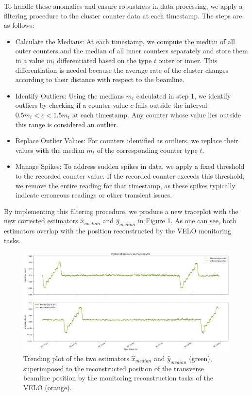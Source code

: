 To handle these anomalies and ensure robustness in data processing, we apply a filtering procedure to the cluster counter data at each timestamp. The steps are as follows:
\begin{itemize}
    \item Calculate the Medians: At each timestamp, we compute the median of all outer counters and the median of all inner counters separately and store them in a value $m_t$ differentiated based on the type $t$ outer or inner. This differentiation is needed because the average rate of the cluster changes according to their distance with respect to the beamline.
    \item Identify Outliers: Using the medians $m_t$ calculated in step 1, we identify outliers by checking if a counter value $c$ falls outside the interval $0.5 m_t < c < 1.5 m_t$ at each timestamp. Any counter whose value lies outside this range is considered an outlier.
    \item Replace Outlier Values: For counters identified as outliers, we replace their values with the median $m_t$ of the corresponding counter type $t$.
    \item Manage Spikes: To address sudden spikes in data, we apply a fixed threshold to the recorded counter value. If the recorded counter exceeds this threshold, we remove the entire reading for that timestamp, as these spikes typically indicate erroneous readings or other transient issues.
\end{itemize}

By implementing this filtering procedure, we produce a new traceplot with the new corrected estimators $\hat{x}_{median}$ and $\hat{y}_{median}$ in Figure \ref{fig:traceplot_off}. As one can see, both estimators overlap with the position reconstructed by the VELO monitoring tasks. 

\begin{figure}
    \centering
    \includegraphics[width=\textwidth]{figures/traceplot_zoom.png}
    \caption{Trending plot of the two estimators $\hat{x}_{median}$ and $\hat{y}_{median}$ (green), superimposed to the reconstructed position of the transverse beamline position by the monitoring reconstruction tasks of the VELO (orange).}
    \label{fig:traceplot_off}
\end{figure}

